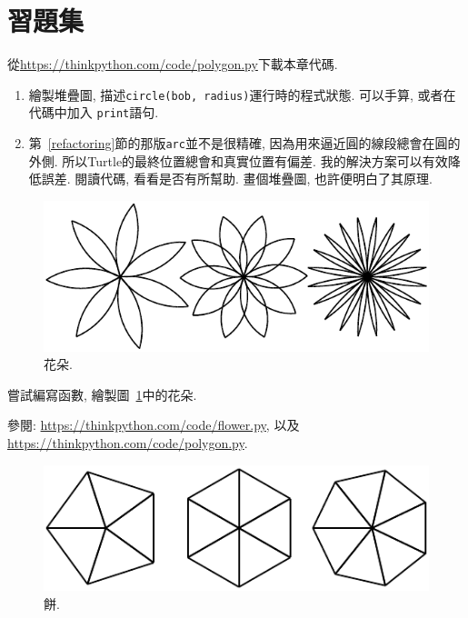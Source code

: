 \documentclass[10pt]{book}
\begin{document}
\section{習題集}

\begin{exercise}

從\url{https://thinkpython.com/code/polygon.py}下載本章代碼. 

\begin{enumerate}

\item 繪製堆疊圖, 描述{\tt circle(bob, radius)}運行時的程式狀態. 
可以手算, 或者在代碼中加入 {\tt print}語句.

\item 第~\ref{refactoring}節的那版{\tt arc}並不是很精確, 
因為用來逼近圓的線段總會在圓的外側. 
所以Turtle的最終位置總會和真實位置有偏差. 
我的解決方案可以有效降低誤差. 閱讀代碼, 看看是否有所幫助. 
畫個堆疊圖, 也許便明白了其原理. 

\end{enumerate}

\end{exercise}

\begin{figure}
\centerline
{\includegraphics[scale=0.8]{figs/flowers.pdf}}
\caption{花朵.}
\label{fig.flowers}
\end{figure}

\begin{exercise}

嘗試編寫函數, 繪製圖~\ref{fig.flowers}中的花朵. 

參閱: \url{https://thinkpython.com/code/flower.py},
以及 \url{https://thinkpython.com/code/polygon.py}.

\end{exercise}

\begin{figure}
\centerline
{\includegraphics[scale=0.8]{figs/pies.pdf}}
\caption{餅.}
\label{fig.pies}
\end{figure}
\end{document}
